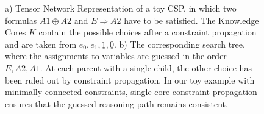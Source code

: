 \documentclass[aps,onecolumn,nofootinbib,pra]{article}
\begin{document}
\begin{figure}
        \caption{a) Tensor Network Representation of a toy CSP, in which two formulas ${A1} \oplus {A2}$ and $E\Rightarrow {A2}$ have to be satisfied.
        The Knowledge Cores $K$ contain the possible choices after a constraint propagation and are taken from $e_0,e_1,\underline{1},\underline{0}$.
        b) The corresponding search tree, where the assignments to variables are guessed in the order $E,{A2},{A1}$.
        At each parent with a single child, the other choice has been ruled out by constraint propagation.
        In our toy example with minimally connected constraints, single-core constraint propagation ensures that the guessed reasoning path remains consistent.}
    \end{figure}
\end{document}

